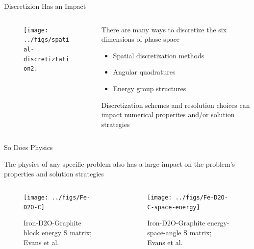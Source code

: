 \documentclass[xcolor=x11names,compress]{beamer}
\renewcommand{\(}{\begin{columns}}
\renewcommand{\)}{\end{columns}}
\newcommand{\<}[1]{\begin{column}{#1}}
\renewcommand{\>}{\end{column}}
\begin{document}
\begin{frame}{Discretizion Has an Impact}

    \begin{columns}
    \begin{column}{0.45\textwidth}
        \begin{center}
 	    \begin{figure}
 	    \texttt{[image: ../figs/spatial-discretiztation2]}
        \end{figure}
 	    \end{center}
  	\end{column}
 	\begin{column}{0.5\textwidth}
        There are many ways to \textcolor{dgreen}{discretize} the six dimensions of 
        phase space
        \begin{itemize}
        \item Spatial discretization methods
        \item Angular quadratures
        \item Energy group structures
        \end{itemize}
    
        \vspace*{1 em}
        \textcolor{dgreen}{Discretization} schemes and resolution choices can impact 
        numerical properites and/or solution strategies
  	\end{column}
	\end{columns}
 
\end{frame}

\begin{frame}{So Does Physics}

    The physics of any specific problem also has a large impact on the
    problem's properties and solution strategies
    
    \begin{columns}
    \begin{column}{0.45\textwidth}
 	   \begin{center}
 	   \begin{figure}
 	   \texttt{[image: ../figs/Fe-D2O-C]}
 	   \caption{Iron-D2O-Graphite block energy S matrix; Evans et al.}
       \end{figure}
 	   \end{center}
  	\end{column}
 	\begin{column}{0.45\textwidth}
 	   \begin{center}
 	   \begin{figure}
 	   \texttt{[image: ../figs/Fe-D2O-C-space-energy]}
 	   \caption{Iron-D2O-Graphite energy-space-angle S matrix; Evans et al.}
       \end{figure}
 	   \end{center}
  	\end{column}
	\end{columns}
       
\end{frame}
\end{document}
